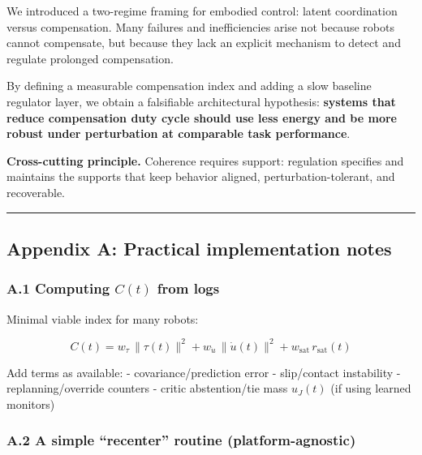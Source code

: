 \documentclass[11pt]{article}
\begin{document}
We introduced a two-regime framing for embodied control: latent coordination versus compensation. Many failures and inefficiencies arise not because robots cannot compensate, but because they lack an explicit mechanism to detect and regulate prolonged compensation.

By defining a measurable compensation index and adding a slow baseline regulator layer, we obtain a falsifiable architectural hypothesis: \textbf{systems that reduce compensation duty cycle should use less energy and be more robust under perturbation at comparable task performance}.

\noindent\textbf{Cross-cutting principle.} Coherence requires support: regulation specifies and maintains the supports that keep behavior aligned, perturbation-tolerant, and recoverable.

\begin{center}\rule{0.5\linewidth}{0.5pt}\end{center}

\hypertarget{appendix-a-practical-implementation-notes}{%
\subsection{Appendix A: Practical implementation notes}\label{appendix-a-practical-implementation-notes}}

\hypertarget{a.1-computing-ct-from-logs}{%
\subsubsection{\texorpdfstring{A.1 Computing \(C(t)\) from logs}{A.1 Computing C(t) from logs}}\label{a.1-computing-ct-from-logs}}

Minimal viable index for many robots:

\[
C(t) = w_\tau\,\|\tau(t)\|^2 + w_{\dot u}\,\|\dot u(t)\|^2 + w_{\text{sat}}\,r_{\text{sat}}(t)
\]

Add terms as available: - covariance/prediction error - slip/contact instability - replanning/override counters - critic abstention/tie mass \(u_{J}(t)\) (if using learned monitors)

\hypertarget{a.2-a-simple-recenter-routine-platform-agnostic}{%
\subsubsection{A.2 A simple ``recenter'' routine (platform-agnostic)}\label{a.2-a-simple-recenter-routine-platform-agnostic}}
\end{document}
